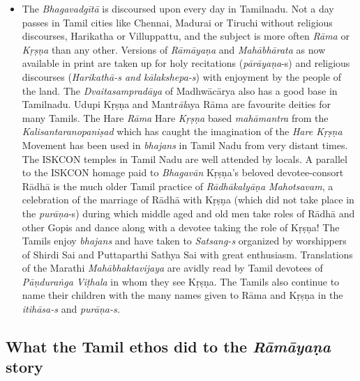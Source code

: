 \begin{itemize}
\item The \textit{Bhagavadgītā} is discoursed upon every day in Tamilnadu. Not a day passes in Tamil cities like Chennai, Madurai or Tiruchi without religious discourses, Harikatha or Villuppattu, and the subject is more often \textit{Rāma} or \textit{Kṛṣṇa} than any other. Versions of \textit{Rāmāyaṇa} and \textit{Mahābhārata} as now available in print are taken up for holy recitations (\textit{pārāyaṇa}-s) and religious discourses (\textit{Harikathā-s and kālakshepa-s}) with enjoyment by the people of the land. The \textit{Dvaitasampradāya} of Madhwācārya also has a good base in Tamilnadu. Udupi Kṛṣṇa and Mantr\textit{āl}aya Rāma are favourite deities for many Tamils. The Hare \textit{Rāma} Hare \textit{Kṛṣṇa} based \textit{mahāmantra} from the \textit{Kalisantaranopaniṣad} which has caught the imagination of the \textit{Hare Kṛṣṇa} Movement has been used in \textit{bhajans} in Tamil Nadu from very distant times. The ISKCON temples in Tamil Nadu are well attended by locals. A parallel to the ISKCON homage paid to \textit{Bhagavān} Kṛṣṇa’s beloved devotee-consort Rādhā is the much older Tamil practice of \textit{Rādhākalyāṇa Mahotsavam}, a celebration of the marriage of Rādhā with Kṛṣṇa (which did not take place in the \textit{purāņa}-s) during which middle aged and old men take roles of Rādhā and other Gopis and dance along with a devotee taking the role of Kṛṣṇa! The Tamils enjoy \textit{bhajans} and have taken to \textit{Satsang-s} organized by worshippers of Shirdi Sai and Puttaparthi Sathya Sai with great enthusiasm. Translations of the Marathi \textit{Mahābhaktavijaya} are avidly read by Tamil devotees of \textit{Pāṇduraṅga Viṭhala} in whom they see Kṛṣṇa. The Tamils also continue to name their children with the many names given to Rāma and Kṛṣṇa in the \textit{itihāsa-s} and \textit{purāṇa-s.}

\end{itemize}


\subsection*{What the Tamil ethos did to the \textit{Rāmāyaṇa} story}


